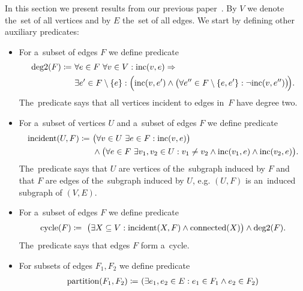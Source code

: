 In this section we present results from our previous paper~\cite{my_paper}.
By \( V \) we denote the~set of all vertices and
by \( E \) the~set of all edges.
We start by defining other auxiliary predicates:
%
\begin{itemize}
	\item For a~subset of edges \( F \) we define predicate
	      \begin{align*}
		      \text{deg2}(F) \coloneqq \ 
		       & \forall e \in F \  \forall v \in V : \text{inc} (v, e) \Rightarrow                                                                      \\
		       & \exists e' \in F \setminus \{e\} : \Big( \text{inc} (v, e') \land \big(\forall e'' \in F \setminus \{e, e'\}: \lnot \text{inc} (v, e'')\big)\!\Big).
	      \end{align*}
	      The~predicate says that all vertices incident to edges in~\( F \) have degree two.
	\item For a~subset of vertices \( U \) and a~subset of edges \( F \) we define predicate
	      \begin{align*}
		      \text{incident}(U, F) \coloneqq \ 
		       & \big(\forall v \in U \  \exists e \in F : \text{inc} (v, e)\big)                                                       \\
		       & \land \big(\forall e \in F \  \exists v_1, v_2 \in U : v_1 \ne v_2 \land \text{inc} (v_1, e) \land \text{inc} (v_2, e)\big).
	      \end{align*}
	      The~predicate says that \( U \) are vertices of the~subgraph induced by \( F \)
	      and that \( F \) are edges of the~subgraph induced by \( U \),
	      e.g. \( (U, F) \) is an~induced subgraph of \( (V, E) \).
	\item For a~subset of edges \( F \) we define predicate
	      \begin{align*}
		      \text{cycle}(F) \coloneqq \ 
		      \big( \exists X \subseteq V : \text{incident}(X, F) \land \text{connected}(X) \big)
		      \land \text{deg2}(F).
	      \end{align*}
	      The~predicate says that edges \( F \) form a~cycle.
	\item For subsets of edges \( F_1, F_2 \) we define predicate
	      \begin{align*}
		      \text{partition}(F_1, F_2) \coloneqq \predsp
		       & (\exists e_1, e_2 \in E : e_1 \in F_1 \land e_2 \in F_2 )    \\

\end{align*}
\end{itemize}
